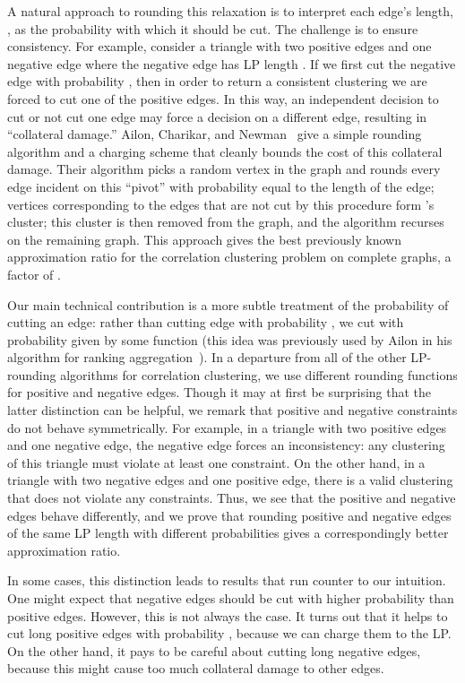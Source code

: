 \documentclass[11pt]{article}
\theoremstyle{definition}
\theoremstyle{remark}
\begin{document}
A natural approach to rounding this relaxation is to interpret each edge's
length, , as the probability with which it should be cut. The challenge
is to ensure consistency. For example, consider a triangle with two positive
edges and one negative edge where the negative edge has LP length
. If we first cut the negative edge with probability , then
in order to return a consistent clustering we are forced to cut one of the positive edges. In
this way, an independent decision to cut or not cut one edge may force a
decision on a different edge, resulting in ``collateral damage.'' Ailon,
Charikar, and Newman~\cite{ACN08} give a simple rounding
algorithm and a charging scheme that cleanly bounds the cost of this collateral
damage. Their algorithm picks a random vertex  in the graph and rounds every
edge  incident on this ``pivot'' with probability equal to the length of
the edge; vertices  corresponding to the edges  that are not cut by
this procedure form 's cluster; this cluster is then removed from the graph,
and the algorithm recurses on the remaining graph. This approach gives the best
previously known approximation ratio for the correlation clustering problem on
complete graphs, a factor of .



Our main technical contribution is a more subtle treatment of the probability
of cutting an edge:  rather than cutting edge  with probability
, we cut  with probability given by some function 
(this idea was previously used by Ailon in his algorithm for ranking
aggregation~\cite{ailon2010}).
In a departure from all of the other LP-rounding algorithms for correlation
clustering, we use different rounding functions for positive and
negative edges.
Though it may at first be surprising that the latter distinction can be
helpful, we remark that positive and negative constraints do not behave
symmetrically. For example, in a triangle with two positive edges and one
negative edge, the negative edge forces an inconsistency: any clustering of
this triangle must violate at least one constraint. On the other hand, in a
triangle with two negative edges and one positive edge, there is a valid
clustering that does not violate any constraints. Thus, we see that the
positive and negative edges behave differently, and we prove that rounding
positive and negative edges of the same LP length with different probabilities
gives a correspondingly better approximation ratio.

In some cases, this distinction leads to results that run counter to our
intuition. One might expect that negative edges should be cut with higher
probability than positive edges. However, this is not always the
case.  It turns out that it helps to cut long positive edges with probability ,
because we can charge them to the LP. On the other hand, it pays to be careful
about cutting long negative edges, because this might cause too much collateral
damage to other edges.
\end{document}

